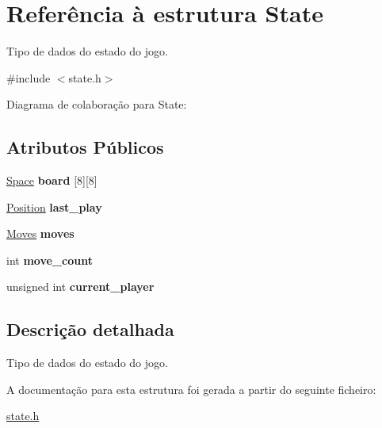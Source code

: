\hypertarget{structState}{}\section{Referência à estrutura State}
\label{structState}


Tipo de dados do estado do jogo.  




{\ttfamily \#include $<$state.\+h$>$}



Diagrama de colaboração para State\+:
\subsection*{Atributos Públicos}
\begin{DoxyCompactItemize}
\item 
\mbox{\label{structState_a40a2af0e5f8ed06f7ead12cff2c23c49}} 
\hyperlink{state_8h_ab11a1dda34491acff014ddfc9e6bafb8}{Space} {\bfseries board} \mbox{[}8\mbox{]}\mbox{[}8\mbox{]}
\item 
\mbox{\label{structState_a3f6a64d7daf33ca88bb256ced24906f9}} 
\hyperlink{structPosition}{Position} {\bfseries last\+\_\+play}
\item 
\mbox{\label{structState_a9f2c6e182f5062c98a9b23276c8dd4ae}} 
\hyperlink{state_8h_a56a7a8f227c1cea3009cfd9997db57f1}{Moves} {\bfseries moves}
\item 
\mbox{\label{structState_a2ebf2a07995abe50b4cf476c5ee190a2}} 
int {\bfseries move\+\_\+count}
\item 
\mbox{\label{structState_ace4c5cff51e2987aa03142bc846eaf6b}} 
unsigned int {\bfseries current\+\_\+player}
\end{DoxyCompactItemize}


\subsection{Descrição detalhada}
Tipo de dados do estado do jogo. 

A documentação para esta estrutura foi gerada a partir do seguinte ficheiro\+:\begin{DoxyCompactItemize}
\item 
\hyperlink{state_8h}{state.\+h}\end{DoxyCompactItemize}
